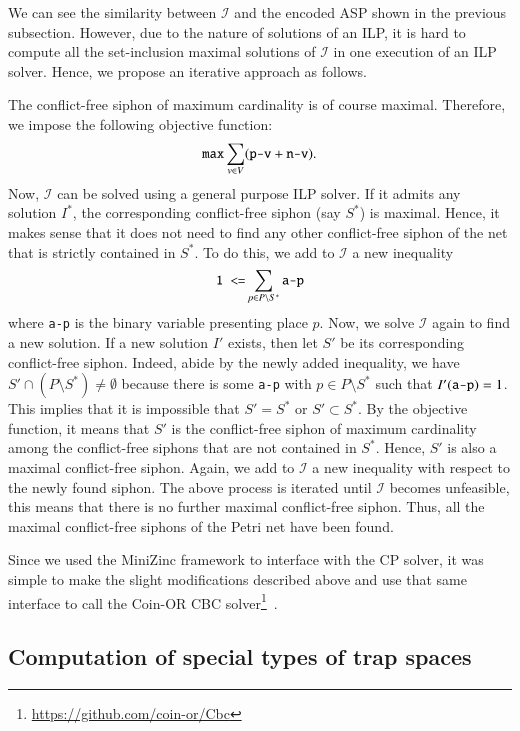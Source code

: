 \documentclass[preprint,12pt]{elsarticle}
\begin{document}
We can see the similarity between \(\mathcal{I}\) and the encoded ASP shown in the previous subsection.
However, due to the nature of solutions of an ILP, it is hard to compute all the set-inclusion maximal solutions of \(\mathcal{I}\) in one execution of an ILP solver.
Hence, we propose an iterative approach as follows.

The conflict-free siphon of maximum cardinality is of course maximal.
Therefore, we impose the following objective function:
\[
  \verb|max| \sum_{v \in V}(\verb|p-v| + \verb|n-v|).
\]
Now, \(\mathcal{I}\) can be solved using a general purpose ILP solver.
If it admits any solution \(I^{*}\), the corresponding conflict-free siphon (say \(S^{*}\)) is maximal.
Hence, it makes sense that it does not need to find any other conflict-free siphon of the net that is strictly contained in \(S^{*}\).
To do this, we add to \(\mathcal{I}\) a new inequality
\[
  \verb|1 <=| \sum_{p \in P \setminus S^{*}} \verb|a-p|
\]
where \verb|a-p| is the binary variable presenting place \(p\).
Now, we solve \(\mathcal{I}\) again to find a new solution.
If a new solution \(I'\) exists, then let \(S'\) be its corresponding conflict-free siphon.
Indeed, abide by the newly added inequality, we have \(S' \cap (P \setminus S^{*}) \neq \emptyset\) because there is some \verb|a-p| with \(p \in P \setminus S^{*}\) such that \(I'(\verb|a-p|) = 1\).
This implies that it is impossible that \(S' = S^{*}\) or \(S' \subset S^{*}\).
By the objective function, it means that \(S'\) is the conflict-free siphon of maximum cardinality among the conflict-free siphons that are not contained in \(S^{*}\).
Hence, \(S'\) is also a maximal conflict-free siphon.
Again, we add to \(\mathcal{I}\) a new inequality with respect to the newly found siphon.
The above process is iterated until \(\mathcal{I}\) becomes unfeasible, this means that there is no further maximal conflict-free siphon.
Thus, all the maximal conflict-free siphons of the Petri net have been found.

Since we used the MiniZinc framework to interface with the CP solver, it was simple to make the slight modifications described above and use that same interface to call the Coin-OR CBC solver\footnote{\url{https://github.com/coin-or/Cbc}}~\cite{john_forrest_2022_6522795}.

\subsection{Computation of special types of trap spaces}%
\label{subsec:computation_special_ts}
\end{document}
